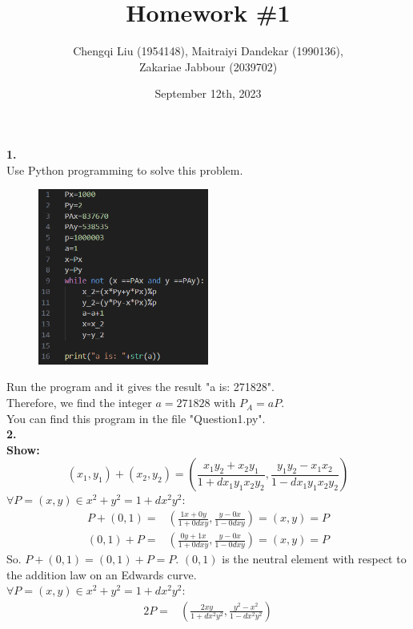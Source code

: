 \documentclass[
	12pt, %
]{fphw}
\title{Homework \#1} %
\author{Chengqi Liu (1954148), Maitraiyi Dandekar (1990136),\\ Zakariae Jabbour (2039702)} %
\date{September 12th, 2023} %
\institute{Eindhoven University of Technology} %
\begin{document}
\maketitle %

\textbf{1.}\\
Use Python programming to solve this problem.\\
\begin{figure}[H] 
	\includegraphics[width=0.5\textwidth]{1.png}
\end{figure}
Run the program and it gives the result "a is: 271828".\\
Therefore, we find the integer $a=271828$ with $P_A=aP$.\\
You can find this program in the file "Question1.py".\\
\textbf{2.}\\
\textbf{Show:\\}
\[(x_1,y_1)+(x_2,y_2)=(\frac{x_1y_2+x_2y_1}{1+dx_1y_1x_2y_2},\frac{y_1y_2-x_1x_2}{1-dx_1y_1x_2y_2})\]
$\forall P=(x,y)\in x^2+y^2=1+dx^2y^2$:
\begin{align*}
	P+(0,1)=&(\frac{1x+0y}{1+0dxy},\frac{y-0x}{1-0dxy})=(x,y)=P\\
	(0,1)+P=&(\frac{0y+1x}{1+0dxy},\frac{y-0x}{1-0dxy})=(x,y)=P
\end{align*}
So. $P+(0,1)=(0,1)+P=P$. $(0,1)$ is the neutral element with respect to the addition law on an Edwards curve.\\
$\forall P=(x,y)\in x^2+y^2=1+dx^2y^2$:
\begin{align*}
	2P=&(\frac{2xy}{1+dx^2y^2},\frac{y^2-x^2}{1-dx^2y^2})
\end{align*}
\end{document}
